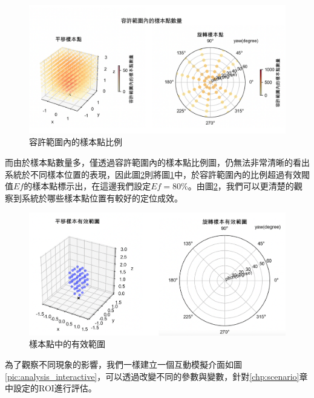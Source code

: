 \begin{figure}[htpb]
    \centering
    \includegraphics[width=14cm]{ch4pic/tolerance.png}
    \caption{容許範圍內的樣本點比例}
    \label{pic:sample_out}
\end{figure}

而由於樣本點數量多，僅透過容許範圍內的樣本點比例圖，仍無法非常清晰的看出系統於不同樣本位置的表現，因此圖\ref{pic:effective}則將圖\ref{pic:sample_out}中，於容許範圍內的比例超過有效閥值$Ef$的樣本點標示出，在這邊我們設定$Ef=80\%$。由圖\ref{pic:effective}，我們可以更清楚的觀察到系統於哪些樣本點位置有較好的定位成效。

\begin{figure}[htpb]
    \centering
    \includegraphics[width=14cm]{ch4pic/effective.png}
    \caption{樣本點中的有效範圍}
    \label{pic:effective}
\end{figure}



為了觀察不同現象的影響，我們一樣建立一個互動模擬介面如圖\ref{pic:analysis_interactive}，可以透過改變不同的參數與變數，針對\ref{chp:scenario}章中設定的ROI進行評估。

